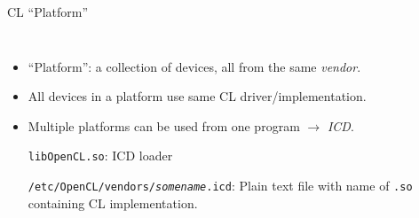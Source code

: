 \begin{frame}{CL ``Platform''}
  \begin{columns}
    \begin{itemize}
      \item ``Platform'': a collection of devices, all from 
        the same \emph{vendor}.

      \item All devices in a platform use same CL driver/implementation.
      \item Multiple platforms can be used from one
        program $\rightarrow$ \emph{ICD}.

        \medskip
        \texttt{libOpenCL.so}: ICD loader

        \medskip
        \texttt{/etc/OpenCL/vendors/\textit{somename}.icd}:
          Plain text file with name of \texttt{.so} containing 
          CL implementation.

    \end{itemize}
  \end{columns}
\end{frame}
